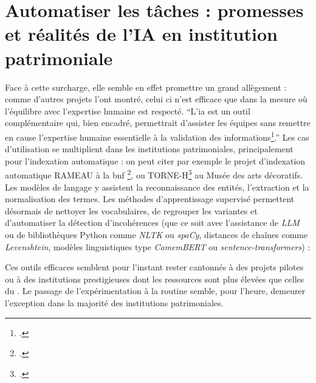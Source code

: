 \section{\label{III-C-1}Automatiser les tâches : promesses et réalités de l’IA en institution patrimoniale}



Face à cette surcharge, elle semble en effet promettre un grand allègement : comme d'autres projets l'ont montré, celui ci n'est efficace que dans la mesure où l'équilibre avec l'expertise humaine est respecté. \enquote{L’\ac{ia} est \textelp{} un outil complémentaire qui, bien encadré, permettrait d’assister les équipes sans remettre en cause l’expertise humaine essentielle à la validation des informations\footcite{bermesRepenserCollectionsPatrimoniales2025}.} Les cas d’utilisation se multiplient dans les institutions patrimoniales, principalement pour l’indexation automatique : on peut citer par exemple le projet d'indexation automatique RAMEAU à la \ac{bnf} \footcite{filabesLindexationRAMEAUAssistee2025}, ou TORNE-H\footcite{bermesRepenserCollectionsPatrimoniales2025} au Musée des arts décoratifs. Les modèles de langage y assistent la reconnaissance des entités, l’extraction et la normalisation des termes. Les méthodes d’apprentissage supervisé permettent désormais de nettoyer les vocabulaires, de regrouper les variantes et d’automatiser la détection d’incohérences (que ce soit avec l'assistance de \textit{LLM} ou de bibliothèques Python comme \textit{NLTK} ou \textit{spaCy}, distances de chaînes comme \textit{Levenshtein}, modèles linguistiques type \textit{CamemBERT} ou \textit{sentence-transformers}) :


Ces outils efficaces semblent pour l'instant rester cantonnés à des projets pilotes ou à des institutions prestigieuses dont les ressources sont plus élevées que celles du \mae. Le passage de l’expérimentation à la routine semble, pour l’heure, demeurer l’exception dans la majorité des institutions patrimoniales.